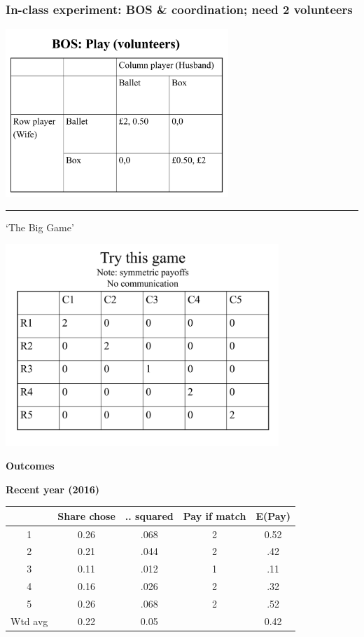 \documentclass[]{article}
\begin{document}
\hypertarget{in-class-experiment-bos-coordination-need-2-volunteers}{%
\subsubsection{In-class experiment: BOS \& coordination; need 2
volunteers}\label{in-class-experiment-bos-coordination-need-2-volunteers}}

\includegraphics[height=2.5in]{picsfigs/BOS_inlecture.png}

\begin{center}\rule{0.5\linewidth}{\linethickness}\end{center}

`The Big Game'

\includegraphics[height=3in]{picsfigs/coordgame_inlecture.png}

\textbf{Outcomes}

\textbf{Recent year (2016)}

\begin{longtable}[]{@{}ccccc@{}}
\toprule
& Share chose & .. squared & Pay if match & E(Pay)\tabularnewline
\midrule
\endhead
1 & 0.26 & .068 & 2 & 0.52\tabularnewline
2 & 0.21 & .044 & 2 & .42\tabularnewline
3 & 0.11 & .012 & 1 & .11\tabularnewline
4 & 0.16 & .026 & 2 & .32\tabularnewline
5 & 0.26 & .068 & 2 & .52\tabularnewline
Wtd avg & 0.22 & 0.05 & & 0.42\tabularnewline
\bottomrule
\end{longtable}
\end{document}
